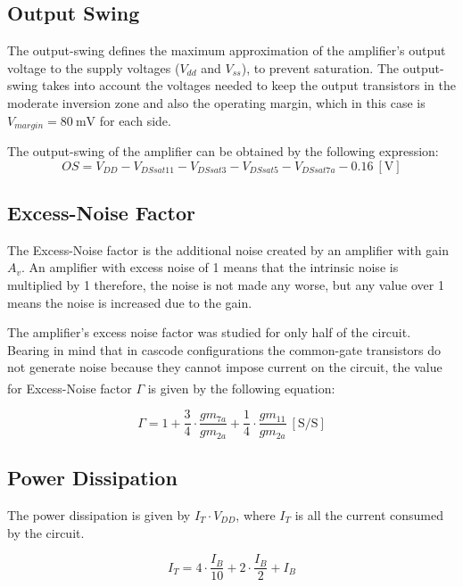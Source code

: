\subsection{Output Swing}
The output-swing defines the maximum approximation of the amplifier's output voltage to the supply voltages ($V_{dd}$ and $V_{ss}$), to prevent saturation. The output-swing takes into account the voltages needed to keep the output transistors in the moderate inversion zone and also the operating margin, which in this case is $V_{margin}=\SI{80}{\milli\volt}$ for each side.

The output-swing of the amplifier can be obtained by the following expression:
\begin{equation}
    OS = V_{DD} - V_{DSsat11} - V_{DSsat3} - V_{DSsat5} - V_{DSsat7a} - 0.16 \ [\si{\volt}]
    \label{eq:OS}
\end{equation}

\subsection{Excess-Noise Factor}
The Excess-Noise factor is the additional noise created by an amplifier with gain $A_v$. An amplifier with excess noise of 1 means that the intrinsic noise is multiplied by 1 therefore, the noise is not made any worse, but any value over 1 means the noise is increased due to the gain.

The amplifier's excess noise factor was studied for only half of the circuit. Bearing in mind that in cascode configurations the common-gate transistors do not generate noise because they cannot impose current on the circuit, the value for Excess-Noise factor $\Gamma$ is given by the following equation\textsuperscript{\cite{artigo-prof}}:

\begin{equation}
    \Gamma = 1 + \frac{3}{4}\cdot \frac{gm_{7a}}{gm_{2a}} + \frac{1}{4}\cdot \frac{gm_{11}}{gm_{2a}} \ [\si{\siemens / \siemens}]
    \label{eq:ENF}
\end{equation}


\subsection{Power Dissipation}

The power dissipation is given by $I_T\cdot V_{DD}$, where $I_T$ is all the current consumed by the circuit. 

\begin{equation}
    I_T = 4\cdot \frac{I_B}{10} + 2\cdot\frac{I_B}{2} + I_B 
\end{equation}


